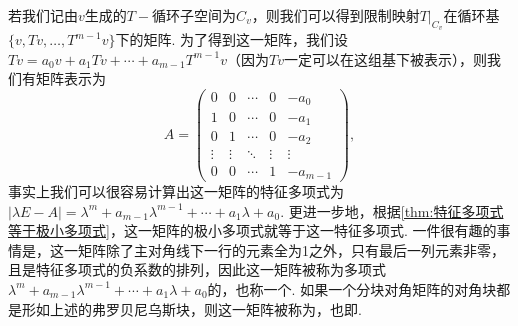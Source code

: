 若我们记由$v$生成的$T-\text{循环子空间}$为$C_v$，则我们可以得到限制映射$T|_{C_v}$在循环基$\{v,Tv,\ldots,T^{m-1}v\}$下的矩阵. 为了得到这一矩阵，我们设$Tv=a_0v+a_1Tv+\cdots+a_{m-1}T^{m-1}v$（因为$Tv$一定可以在这组基下被表示），则我们有矩阵表示为
\[A=\begin{pmatrix}
        0      & 0      & \cdots & 0      & -a_0     \\
        1      & 0      & \cdots & 0      & -a_1     \\
        0      & 1      & \cdots & 0      & -a_2     \\
        \vdots & \vdots & \ddots & \vdots & \vdots   \\
        0      & 0      & \cdots & 1      & -a_{m-1}
    \end{pmatrix},\]
事实上我们可以很容易计算出这一矩阵的特征多项式为$|\lambda E-A|=\lambda^m+a_{m-1}\lambda^{m-1}+\cdots+a_1\lambda+a_0$. 更进一步地，根据\autoref{thm:特征多项式等于极小多项式}，这一矩阵的极小多项式就等于这一特征多项式. 一件很有趣的事情是，这一矩阵除了主对角线下一行的元素全为1之外，只有最后一列元素非零，且是特征多项式的负系数的排列，因此这一矩阵被称为多项式$\lambda^m+a_{m-1}\lambda^{m-1}+\cdots+a_1\lambda+a_0$的，也称一个. 如果一个分块对角矩阵的对角块都是形如上述的弗罗贝尼乌斯块，则这一矩阵被称为，也即.

